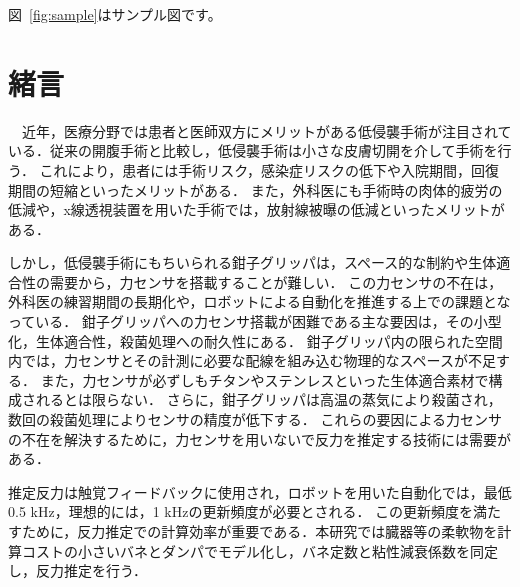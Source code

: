 \documentclass[a4paper]{jarticle}
\begin{document}
図~\ref{fig:sample}はサンプル図です。
\fi

\section{緒言}
　近年，医療分野では患者と医師双方にメリットがある低侵襲手術が注目されている\cite{MIS_ref1}．従来の開腹手術と比較し，低侵襲手術は小さな皮膚切開を介して手術を行う．
これにより，患者には手術リスク，感染症リスクの低下\cite{MIS_ref2}や入院期間\cite{MIS_ref3}，回復期間の短縮\cite{MIS_ref4}といったメリットがある．
また，外科医にも手術時の肉体的疲労の低減や，x線透視装置を用いた手術では，放射線被曝の低減といったメリットがある\cite{MIS_ref5}．

しかし，低侵襲手術にもちいられる鉗子グリッパは，スペース的な制約\cite{MIS_ref1}や生体適合性の需要\cite{MIS_ref6}から，力センサを搭載することが難しい．
この力センサの不在は，外科医の練習期間の長期化\cite{MIS_learning_time}や，ロボットによる自動化を推進する上での課題となっている\cite{RMIS}．
鉗子グリッパへの力センサ搭載が困難である主な要因は，その小型化，生体適合性，殺菌処理への耐久性にある\cite{MIS_ref7}．
鉗子グリッパ内の限られた空間内では，力センサとその計測に必要な配線を組み込む物理的なスペースが不足する\cite{MIS_ref1}．
また，力センサが必ずしもチタンやステンレスといった生体適合素材で構成されるとは限らない\cite{MIS_ref6}．
さらに，鉗子グリッパは高温の蒸気により殺菌され，数回の殺菌処理によりセンサの精度が低下する\cite{MIS_ref7}．
これらの要因による力センサの不在を解決するために，力センサを用いないで反力を推定する技術には需要がある．

 推定反力は触覚フィードバックに使用され，ロボットを用いた自動化では，最低0.5 kHz\cite{fps_ref1}，理想的には，1 kHzの更新頻度が必要とされる\cite{fps_ref2}．
この更新頻度を満たすために，反力推定での計算効率が重要である．本研究では臓器等の柔軟物を計算コストの小さいバネとダンパでモデル化し，バネ定数と粘性減衰係数を同定し，反力推定を行う．

\end{document}
